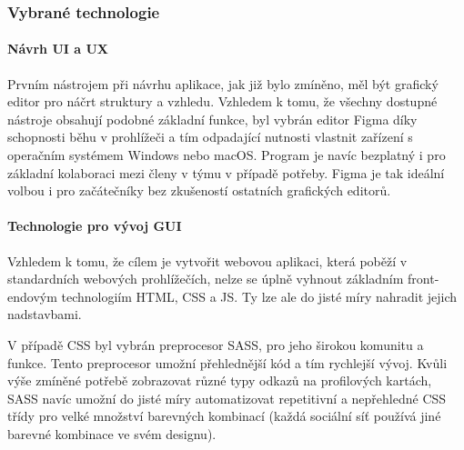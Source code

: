 		\subsubsection{Vybrané technologie}

			\paragraph{Návrh UI a UX}

			Prvním nástrojem při návrhu aplikace, jak již bylo zmíněno, měl být grafický editor pro náčrt struktury a vzhledu.
			Vzhledem k tomu, že všechny dostupné nástroje obsahují podobné základní funkce, byl vybrán editor Figma díky
			schopnosti běhu v prohlížeči a tím odpadající nutnosti vlastnit zařízení s operačním systémem Windows nebo macOS.
			Program je navíc bezplatný i pro základní kolaboraci mezi členy v týmu v případě potřeby.
			Figma je tak ideální volbou i pro začátečníky bez zkušeností ostatních grafických editorů.

			\paragraph{Technologie pro vývoj GUI}

			Vzhledem k tomu, že cílem je vytvořit webovou aplikaci, která poběží v standardních webových prohlížečích,
			nelze se úplně vyhnout základním front-endovým technologiím \Ac{HTML}, \Ac{CSS} a \ac{JS}.
			Ty lze ale do jisté míry nahradit jejich nadstavbami.

			V případě \Ac{CSS} byl vybrán preprocesor \Ac{SASS}, pro jeho širokou komunitu a funkce.
			Tento preprocesor umožní přehlednější kód a tím rychlejší vývoj.
			Kvůli výše zmíněné potřebě zobrazovat různé typy odkazů na profilových kartách, \ac{SASS} navíc umožní
			do jisté míry automatizovat repetitivní a nepřehledné \ac{CSS} třídy pro velké množství barevných kombinací
			(každá sociální síť používá jiné barevné kombinace ve svém designu).


